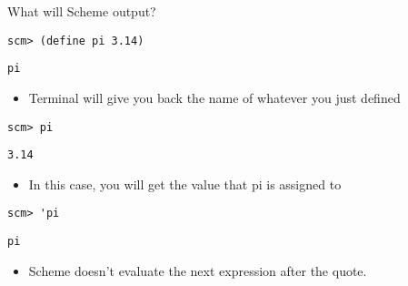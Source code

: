 \begin{blocksection}
\question What will Scheme output?

\begin{comment}
\begin{lstlisting}
scm> 3.14
\end{lstlisting}
\begin{solution}[0.25in] 
\texttt{3.14}
\end{solution}

\begin{lstlisting}
scm> pi
\end{lstlisting}
\begin{solution}[0.25in]
\texttt{Error}
\end{solution}
\end{comment}

\begin{lstlisting}
scm> (define pi 3.14)
\end{lstlisting}
\begin{solution}[0.25in]
\texttt{pi}
\end{solution}

\begin{guide}
\begin{itemize}
\item Terminal will give you back the name of whatever you just defined
\end{itemize}
\end{guide}

\begin{lstlisting}
scm> pi
\end{lstlisting}
\begin{solution}[.25in]
\texttt{3.14}
\end{solution}
\begin{guide}
\begin{itemize}
\item In this case, you will get the value that pi is assigned to
\end{itemize}
\end{guide}

\begin{lstlisting}
scm> 'pi
\end{lstlisting}
\begin{solution}[.25in]
\texttt{pi}
\end{solution}
\begin{guide}
\begin{itemize}
\item Scheme doesn't evaluate the next expression after the quote.
\end{itemize}
\end{guide}


\end{blocksection}
